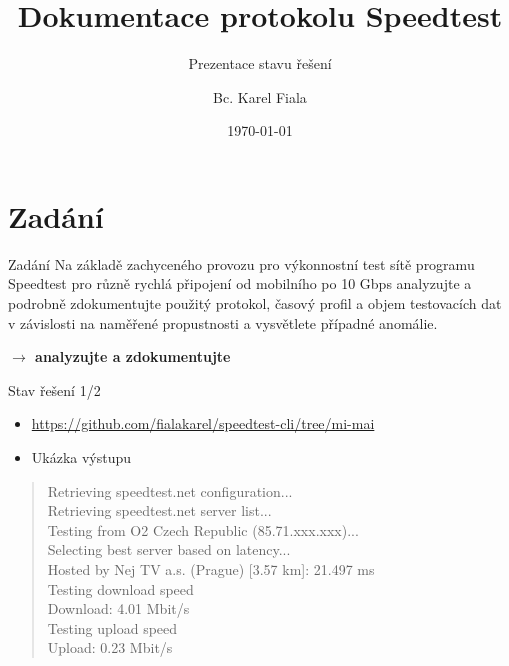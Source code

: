 \documentclass{beamer}
\title[Dokumentace protokolu Speedtest]{Dokumentace protokolu Speedtest}
\subtitle[Prezentace stavu řešení]{Prezentace stavu řešení}
\author[Bc. Karel Fiala]{Bc. Karel Fiala}
\institute[ČVUT FIT]{
   Fakulta informačních technologií \\
   České vysoké učení technické v~Praze
 }
\date{\today}
\begin{document}
\begin{frame}
   \titlepage
\end{frame}




\section{Zadání}
\begin{frame}{Zadání}
Na základě zachyceného provozu pro výkonnostní test sítě programu Speedtest pro různě rychlá připojení od mobilního po 10 Gbps analyzujte a podrobně zdokumentujte použitý protokol, časový profil a objem testovacích dat v závislosti na naměřené propustnosti a vysvětlete případné anomálie.

\bigskip

\hfill \textbf{$\rightarrow$ analyzujte a zdokumentujte} \hfill \hfill 

\end{frame}


\begin{frame}{Stav řešení 1/2}
\begin{itemize}
\item \url{https://github.com/fialakarel/speedtest-cli/tree/mi-mai}
\medskip
\item Ukázka výstupu
\end{itemize}

\begin{quote}
Retrieving speedtest.net configuration...\\
Retrieving speedtest.net server list...\\
Testing from O2 Czech Republic (85.71.xxx.xxx)...\\
Selecting best server based on latency...\\
Hosted by Nej TV a.s. (Prague) [3.57 km]: 21.497 ms\\
Testing download speed\\
Download: 4.01 Mbit/s\\
Testing upload speed\\
Upload: 0.23 Mbit/s\\
\end{quote}

\end{frame}
\end{document}
